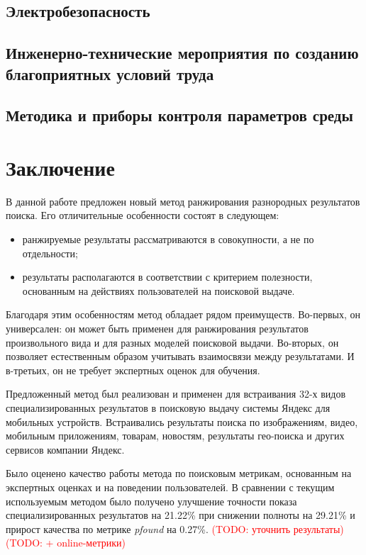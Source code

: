 \documentclass[12pt,a4paper]{report}
\newcommand\note[1]{\textcolor{red}{(#1)}}
\newcommand\todonote[1]{\note{TODO: #1}}
\begin{document}
\section{Электробезопасность}
\section{Инженерно-технические мероприятия по созданию благоприятных условий труда}
\section{Методика и приборы контроля параметров среды}

\chapter*{Заключение}

В данной работе предложен новый метод ранжирования разнородных результатов поиска. Его отличительные особенности состоят в следующем:
\begin{itemize}
  \item ранжируемые результаты рассматриваются в совокупности, а не по отдельности;
  \item результаты располагаются в соответствии с критерием полезности, основанным на действиях пользователей на поисковой выдаче. %
\end{itemize}
Благодаря этим особенностям метод обладает рядом преимуществ. Во-первых, он универсален: он может быть применен для ранжирования результатов произвольного вида и для разных моделей поисковой выдачи. Во-вторых, он позволяет естественным образом учитывать взаимосвязи между результатами. И в-третьих, он не требует экспертных оценок для обучения. 


Предложенный метод был реализован и применен для встраивания 32-х видов специализированных результатов в поисковую выдачу системы Яндекс для мобильных устройств. Встраивались результаты поиска по изображениям, видео, мобильным приложениям, товарам, новостям, результаты гео-поиска и других сервисов компании Яндекс. 

Было оценено качество работы метода по поисковым метрикам, основанным на экспертных оценках и на поведении пользователей. В сравнении с текущим используемым методом было получено улучшение точности показа специализированных результатов на 21.22\% при снижении полноты на 29.21\% и прирост качества по метрике \textit{pfound} на 0.27\%. \todonote{уточнить результаты} \todonote{+ online-метрики}
\end{document}
